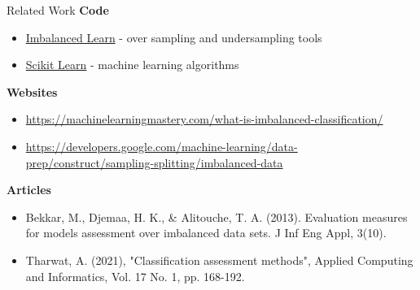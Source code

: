 \begin{frame}{Related Work}
    \textbf{Code}
    \begin{itemize}
        \item \href{https://imbalanced-learn.org/stable/}{Imbalanced Learn} - over sampling and undersampling tools
        \item \href{https://scikit-learn.org/}{Scikit Learn} - machine learning algorithms
    \end{itemize}
    
    \vspace{0.5em}
    
    \textbf{Websites}
    \begin{itemize}
        \item \href{https://machinelearningmastery.com/what-is-imbalanced-classification/}{https://machinelearningmastery.com/what-is-imbalanced-classification/}
        \item \href{https://developers.google.com/machine-learning/data-prep/construct/sampling-splitting/imbalanced-data}{https://developers.google.com/machine-learning/data-prep/construct/sampling-splitting/imbalanced-data}
    \end{itemize}
        \vspace{0.5em}
    
    \textbf{Articles}
    \begin{itemize}
        \item Bekkar, M., Djemaa, H. K., & Alitouche, T. A. (2013). Evaluation measures for models assessment over imbalanced data sets. J Inf Eng Appl, 3(10).
        \item Tharwat, A. (2021), "Classification assessment methods", Applied Computing and Informatics, Vol. 17 No. 1, pp. 168-192. 
    \end{itemize}
\end{frame}
